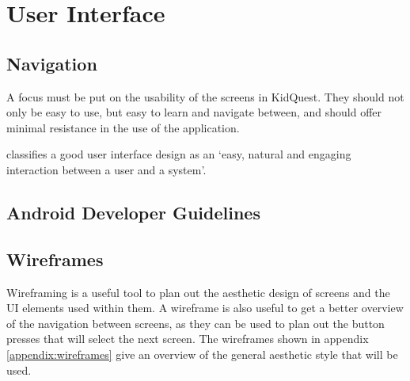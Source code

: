 \section{User Interface}
\subsection{Navigation}
A focus must be put on the usability of the screens in KidQuest.
They should not only be easy to use, but easy to learn and navigate between, and should offer minimal resistance in the use of the application.

\cite{stone2005user} classifies a good user interface design as an `easy, natural and engaging interaction between a user and a system'.

\subsection{Android Developer Guidelines}

\subsection{Wireframes}
Wireframing is a useful tool to plan out the aesthetic design of screens and the UI elements used within them. 
A wireframe is also useful to get a better overview of the navigation between screens, as they can be used to plan out the button presses that will select the next screen.
The wireframes shown in appendix \ref{appendix:wireframes} give an overview of the general aesthetic style that will be used.